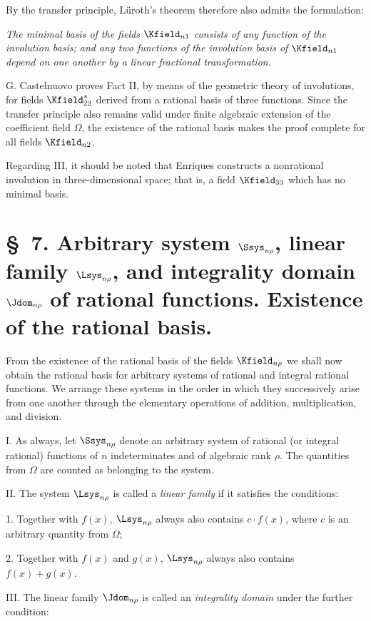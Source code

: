 \documentclass[11pt]{article}
\begin{document}
By the transfer principle, Lüroth's theorem therefore also admits the formulation:

\emph{The minimal basis of the fields $\Kfield_{n1}$ consists of any function of the involution basis; and any two functions of the involution basis of $\Kfield_{n1}$ depend on one another by a linear fractional transformation.}

G. Castelnuovo proves Fact II, by means of the geometric theory of involutions, for fields $\Kfield^*_{22}$ derived from a rational basis of three functions. Since the transfer principle also remains valid under finite algebraic extension of the coefficient field $\Omega$, the existence of the rational basis makes the proof complete for all fields $\Kfield_{n2}$.

Regarding III, it should be noted that Enriques constructs a nonrational involution in three-dimensional space; that is, a field $\Kfield_{33}$ which has no minimal basis.

\section*{\S\ 7. Arbitrary system $\Ssys_{n\rho}$, linear family $\Lsys_{n\rho}$, and integrality domain $\Jdom_{n\rho}$ of rational functions. Existence of the rational basis.}

From the existence of the rational basis of the fields $\Kfield_{n\rho}$ we shall now obtain the rational basis for arbitrary systems of rational and integral rational functions. We arrange these systems in the order in which they successively arise from one another through the elementary operations of addition, multiplication, and division.

I. As always, let $\Ssys_{n\rho}$ denote an arbitrary system of rational (or integral rational) functions of $n$ indeterminates and of algebraic rank $\rho$. The quantities from $\Omega$ are counted as belonging to the system.

II. The system $\Lsys_{n\rho}$ is called a \emph{linear family} if it satisfies the conditions:

1. Together with $f(x)$, $\Lsys_{n\rho}$ always also contains $c\cdot f(x)$, where $c$ is an arbitrary quantity from $\Omega$;

2. Together with $f(x)$ and $g(x)$, $\Lsys_{n\rho}$ always also contains $f(x)+g(x)$.

III. The linear family $\Jdom_{n\rho}$ is called an \emph{integrality domain} under the further condition:
\end{document}

